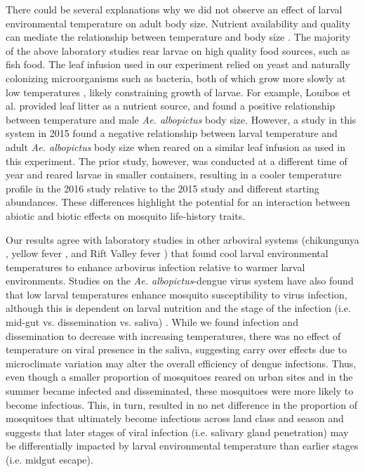 \documentclass[12pt]{article}
\begin{document}
There could be several explanations why we did not observe an effect of larval environmental temperature on adult body size. Nutrient availability and quality can mediate the relationship between temperature and body size \citep{farjana2011}. The majority of the above laboratory studies rear larvae on high quality food sources, such as fish food. The leaf infusion used in our experiment relied on yeast and naturally colonizing microorganisms such as bacteria, both of which grow more slowly at low temperatures \citep{ratkowsky1982}, likely constraining growth of larvae. For example, Louibos et al. \citep{lounibos2002} provided leaf litter as a nutrient source, and found a positive relationship between temperature and male \textit{Ae. albopictus} body size. However, a study in this system in 2015 found a negative relationship between larval temperature and adult \textit{Ae. albopictus} body size \citep{murdock2017} when reared on a similar leaf infusion as used in this experiment. The prior study, however, was conducted at a different time of year and reared larvae in smaller containers, resulting in a cooler temperature profile in the 2016 study relative to the 2015 study and different starting abundances. These differences highlight the potential for an interaction between abiotic and biotic effects on mosquito life-history traits.

Our results agree with laboratory studies in other arboviral systems (chikungunya \citep{adelman2013}, yellow fever \citep{adelman2013}, and Rift Valley fever \citep{turell1993}) that found cool larval environmental temperatures to enhance arbovirus infection relative to warmer larval environments. Studies on the \textit{Ae. albopictus}-dengue virus system have also found that low larval temperatures enhance mosquito susceptibility to virus infection, although this is dependent on larval nutrition \citep{buckner2016} and the stage of the infection (i.e. mid-gut vs. dissemination vs. saliva) \citep{alto2013}. While we found infection and dissemination to decrease with increasing temperatures, there was no effect of temperature on viral presence in the saliva, suggesting carry over effects due to microclimate variation may alter the overall efficiency of dengue infections. Thus, even though a smaller proportion of mosquitoes reared on urban sites and in the summer became infected and disseminated, these mosquitoes were more likely to become infectious. This, in turn, resulted in no net difference in the proportion of mosquitoes that ultimately become infectious across land class and season and suggests that later stages of viral infection (i.e. salivary gland penetration) may be differentially impacted by larval environmental temperature than earlier stages (i.e. midgut escape).
\end{document}

